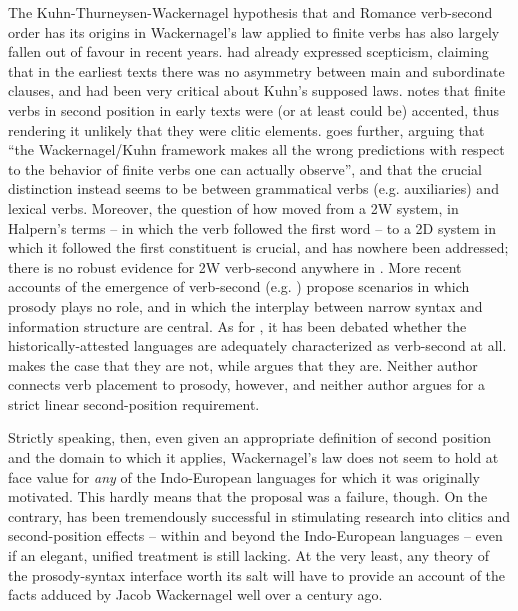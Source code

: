 \documentclass[output=paper]{../langscibook}
\begin{document}
The Kuhn-Thurneysen-Wackernagel hypothesis that  and Romance verb-second order has its origins in Wackernagel's law applied to finite verbs has also largely fallen out of favour in recent years. \citet[23--24, 315--318]{Ries1907} had already expressed scepticism, claiming that in the earliest texts there was no asymmetry between main and subordinate clauses, and \citet{Fourquet1938} had been very critical about Kuhn's supposed laws. \citet[159]{Kiparsky1995} notes that finite verbs in second position in early  texts were (or at least could be) accented, thus rendering it unlikely that they were clitic elements. \citet[158]{Getty1997} goes further, arguing that ``the Wackernagel/Kuhn framework makes all the wrong predictions with respect to the behavior of finite verbs one can actually observe'', and that the crucial distinction instead seems to be between grammatical verbs (e.g. auxiliaries) and lexical verbs. Moreover, the question of how  moved from a 2W system, in Halpern's \citeyearpar{Halpern1995} terms -- in which the verb followed the first word -- to a 2D system in which it followed the first constituent is crucial, and has nowhere been addressed; there is no robust evidence for 2W verb-second anywhere in . More recent accounts of the emergence of verb-second (e.g. \citet{HinterhoelzlPetrova2010,Walkden2012,Walkden2014book,Walkden2015,Walkden2017}) propose scenarios in which prosody plays no role, and in which the interplay between narrow syntax and information structure are central. As for , it has been debated whether the historically-attested languages are adequately characterized as verb-second at all. \citet{Kaiser2002} makes the case that they are not, while \citet{Wolfe2018} argues that they are. Neither author connects verb placement to prosody, however, and neither author argues for a strict linear second-position requirement.

Strictly speaking, then, even given an appropriate definition of second position and the domain to which it applies, Wackernagel's law does not seem to hold at face value for \emph{any} of the Indo-European languages for which it was originally motivated. This hardly means that the proposal was a failure, though. On the contrary, \citet{Wackernagel1892} has been tremendously successful in stimulating research into clitics and second-position effects -- within and beyond the Indo-European languages -- even if an elegant, unified treatment is still lacking. At the very least, any theory of the prosody-syntax interface worth its salt will have to provide an account of the facts adduced by Jacob Wackernagel well over a century ago.
\end{document}
